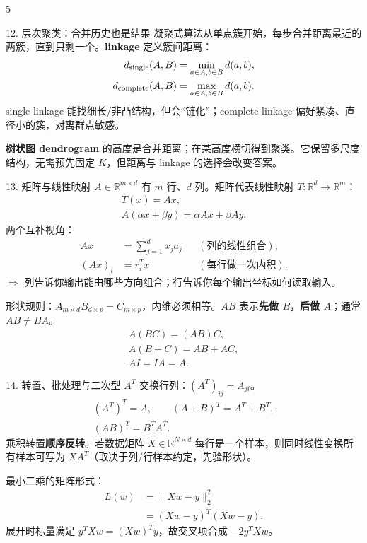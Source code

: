 \documentclass[a4paper,landscape,fontset=fandol]{ctexart}
\newcommand{\term}[1]{\textbf{\color{teal!80!black}#1}}
\newcommand{\warn}[1]{\textbf{\color{red}#1}}
\newcommand{\sense}[1]{\textcolor{muted}{\ensuremath{\Rightarrow} #1}}
\newcommand{\R}{\mathbb{R}}
\begin{document}
\begin{multicols*}{5}
\begin{boxx}{12. 层次聚类：合并历史也是结果}
凝聚式算法从单点簇开始，每步合并距离最近的两簇，直到只剩一个。\term{linkage} 定义簇间距离：
\[
\begin{aligned}
d_{\rm single}(A,B)&=\min_{a\in A,b\in B}d(a,b),\\
d_{\rm complete}(A,B)&=\max_{a\in A,b\in B}d(a,b).
\end{aligned}
\]
single linkage 能找细长/非凸结构，但会“链化”；complete linkage 偏好紧凑、直径小的簇，对离群点敏感。

\term{树状图 dendrogram} 的高度是合并距离；在某高度横切得到聚类。它保留多尺度结构，无需预先固定 $K$，但距离与 linkage 的选择会改变答案。
\end{boxx}

\begin{boxx}{13. 矩阵与线性映射}
$A\in\R^{m\times d}$ 有 $m$ 行、$d$ 列。矩阵代表线性映射 $T:\R^d\to\R^m$：
\[
\begin{gathered}
T(x)=Ax,\\ A(\alpha x+\beta y)=\alpha Ax+\beta Ay.
\end{gathered}
\]
两个互补视角：
\[
\begin{aligned}
Ax&=\sum_{j=1}^d x_j a_j &&(\text{列的线性组合}),\\
(Ax)_i&=r_i^Tx &&(\text{每行做一次内积}).
\end{aligned}
\]
\sense{列告诉你输出能由哪些方向组合；行告诉你每个输出坐标如何读取输入。}

形状规则：$A_{m\times d}B_{d\times p}=C_{m\times p}$，内维必须相等。$AB$ 表示\term{先做 $B$，后做 $A$}；通常 $AB\neq BA$。
\[
\begin{gathered}
A(BC)=(AB)C,\\ A(B+C)=AB+AC,\\ AI=IA=A.
\end{gathered}
\]
\end{boxx}

\columnbreak

\begin{boxx}{14. 转置、批处理与二次型}
$A^T$ 交换行列：$(A^T)_{ij}=A_{ji}$。
\[
\begin{gathered}
(A^T)^T=A,\qquad (A+B)^T=A^T+B^T,\\
(AB)^T=B^TA^T.
\end{gathered}
\]
乘积转置\warn{顺序反转}。若数据矩阵 $X\in\R^{N\times d}$ 每行是一个样本，则同时线性变换所有样本可写为 $XA^T$（取决于列/行样本约定，先验形状）。

最小二乘的矩阵形式：
\[
\begin{aligned}
L(w)&=\|Xw-y\|_2^2\\
&=(Xw-y)^T(Xw-y).
\end{aligned}
\]
展开时标量满足 $y^TXw=(Xw)^Ty$，故交叉项合成 $-2y^TXw$。


\end{boxx}
\end{multicols*}
\end{document}
